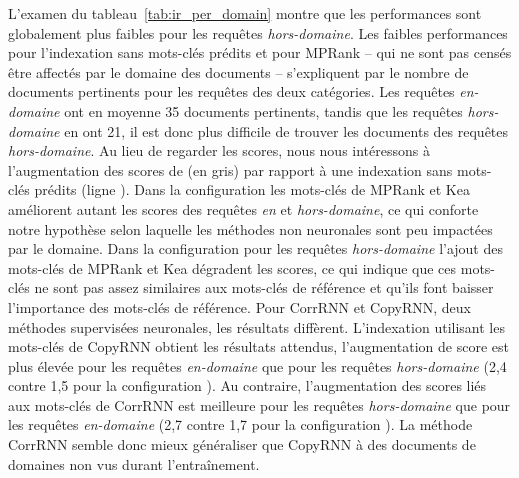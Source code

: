 L'examen du tableau~\ref{tab:ir_per_domain} montre que les performances sont globalement plus faibles pour les requêtes \textit{hors-domaine}.
Les faibles performances pour l'indexation sans mots-clés prédits et pour MPRank -- qui ne sont pas censés être affectés par le domaine des documents -- s'expliquent par le nombre de documents pertinents pour les requêtes des deux catégories. Les requêtes \textit{en-domaine} ont en moyenne 35 documents pertinents, tandis que les requêtes \textit{hors-domaine} en ont 21, il est donc plus difficile de trouver les documents des requêtes \textit{hors-domaine}.
Au lieu de regarder les scores, nous nous intéressons à l'augmentation des scores de \map{} (en gris) par rapport à une indexation sans mots-clés prédits (ligne \say{~-~}).
%
Dans la configuration \tr{} les mots-clés de MPRank et Kea améliorent autant les scores des requêtes \textit{en} et \textit{hors-domaine}, ce qui conforte notre hypothèse selon laquelle les méthodes non neuronales sont peu impactées par le domaine.
Dans la configuration \trm{} pour les requêtes \textit{hors-domaine} l'ajout des mots-clés de MPRank et Kea dégradent les scores, ce qui indique que ces mots-clés ne sont pas assez similaires aux mots-clés de référence et qu'ils font baisser l'importance des mots-clés de référence.
%
Pour CorrRNN et CopyRNN, deux méthodes supervisées neuronales, les résultats diffèrent.
L'indexation utilisant les mots-clés de CopyRNN obtient les résultats attendus, l'augmentation de score est plus élevée pour les requêtes \textit{en-domaine} que pour les requêtes \textit{hors-domaine} (2,4 contre 1,5 pour la configuration \trc{}).
Au contraire, l'augmentation des scores liés aux mots-clés de CorrRNN est meilleure pour les requêtes \textit{hors-domaine} que pour les requêtes \textit{en-domaine} (2,7 contre 1,7 pour la configuration \trc{}).
La méthode CorrRNN semble donc mieux généraliser que CopyRNN à des documents de domaines non vus durant l'entraînement.





